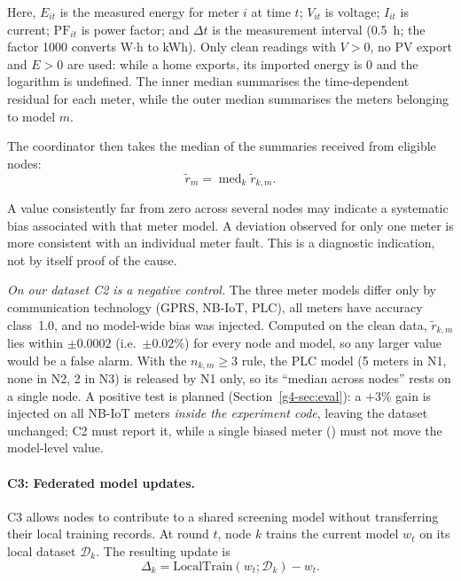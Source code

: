 Here, $E_{it}$ is the measured energy for meter $i$ at time $t$;
$V_{it}$ is voltage; $I_{it}$ is current; $\mathrm{PF}_{it}$ is
power factor; and $\Delta t$ is the measurement interval (0.5~h; the
factor 1000 converts W$\cdot$h to kWh). Only clean readings with
$V>0$, no PV export and $E>0$ are used: while a home exports, its
imported energy is 0 and the logarithm is undefined. The inner median
summarises the time-dependent residual for each meter, while the outer
median summarises the meters belonging to model $m$.

The coordinator then takes the median of the summaries received from
eligible nodes:
\begin{equation}
\widetilde r_m
=
\operatorname{med}_{k}\widetilde r_{k,m}.
\label{g4-eq:protocol-calibration-global}
\end{equation}

A value consistently far from zero across several nodes may indicate
a systematic bias associated with that meter model. A deviation
observed for only one meter is more consistent with an individual
meter fault. This is a diagnostic indication, not by itself proof of
the cause.

\emph{On our dataset C2 is a negative control.} The three meter models
differ only by communication technology (GPRS, NB-IoT, PLC), all meters
have accuracy class~1.0, and no model-wide bias was injected. Computed
on the clean data, $\widetilde r_{k,m}$ lies within $\pm0.0002$ (i.e.\
$\pm0.02\%$) for every node and model, so any larger value would be a
false alarm. With the $n_{k,m}\ge3$ rule, the PLC model (5 meters in N1,
none in N2, 2 in N3) is released by N1 only, so its ``median across
nodes'' rests on a single node. A positive test is planned
(Section~\ref{g4-sec:eval}): a $+3\%$ gain is injected on all NB-IoT meters
\emph{inside the experiment code}, leaving the dataset unchanged; C2
must report it, while a single biased meter (\code{bias\_step}) must not
move the model-level value.

\paragraph{C3: Federated model updates.}

C3 allows nodes to contribute to a shared screening model without
transferring their local training records. At round $t$, node $k$
trains the current model $w_t$ on its local dataset $\mathcal D_k$.
The resulting update is
\begin{equation}
\Delta_k
=
\mathrm{LocalTrain}(w_t;\mathcal D_k)-w_t.
\label{g4-eq:protocol-local-update}
\end{equation}

